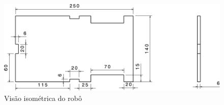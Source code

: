 \begin{figure}[htb]
  \caption{\label{fig:structure-iso} Visão isométrica do robô}

  \begin{center}
    \includegraphics[scale=0.525,page=6]{../img/structure.pdf}
  \end{center}

\end{figure}
